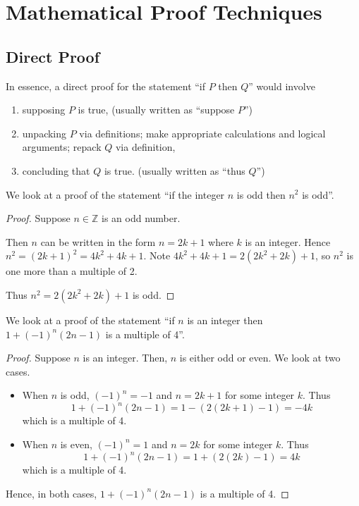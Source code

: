 \section{Mathematical Proof Techniques}
\subsection{Direct Proof}
In essence, a direct proof for the statement ``if $P$ then $Q$'' would involve
\begin{enumerate}
    \item supposing $P$ is true, (usually written as ``suppose $P$'')
    \item unpacking $P$ via definitions; make appropriate calculations and logical arguments; repack $Q$ via definition,
    \item concluding that $Q$ is true. (usually written as ``thus $Q$'')
\end{enumerate}
\begin{example}
    We look at a proof of the statement ``if the integer $n$ is odd then $n^2$ is odd''.
    \begin{proof}
        Suppose $n\in\mathbb{Z}$ is an odd number.
        
        Then $n$ can be written in the form $n = 2k + 1$ where $k$ is an integer. Hence $n^2 = (2k+1)^2 = 4k^2 + 4k + 1$. Note $4k^2 + 4k + 1 = 2(2k^2 + 2k) + 1$, so $n^2$ is one more than a multiple of 2.
        
        Thus $n^2 = 2(2k^2 + 2k) + 1$ is odd.
    \end{proof}
\end{example}

\begin{example}
    We look at a proof of the statement ``if $n$ is an integer then $1 + (-1)^n(2n-1)$ is a multiple of 4''.
    \begin{proof}
        Suppose $n$ is an integer. Then, $n$ is either odd or even. We look at two cases.
        \begin{itemize}
            \item When $n$ is odd, $(-1)^n = -1$ and $n = 2k+1$ for some integer $k$. Thus
            \[
                1 + (-1)^n(2n-1) = 1 - (2(2k+1)-1) = -4k
            \]
            which is a multiple of 4.
            \item When $n$ is even, $(-1)^n = 1$ and $n = 2k$ for some integer $k$. Thus
            \[
                1 + (-1)^n(2n-1) = 1 + (2(2k)-1) = 4k
            \]
            which is a multiple of 4.
        \end{itemize}
        Hence, in both cases, $1 + (-1)^n(2n-1)$ is a multiple of 4.
    \end{proof}
\end{example}

